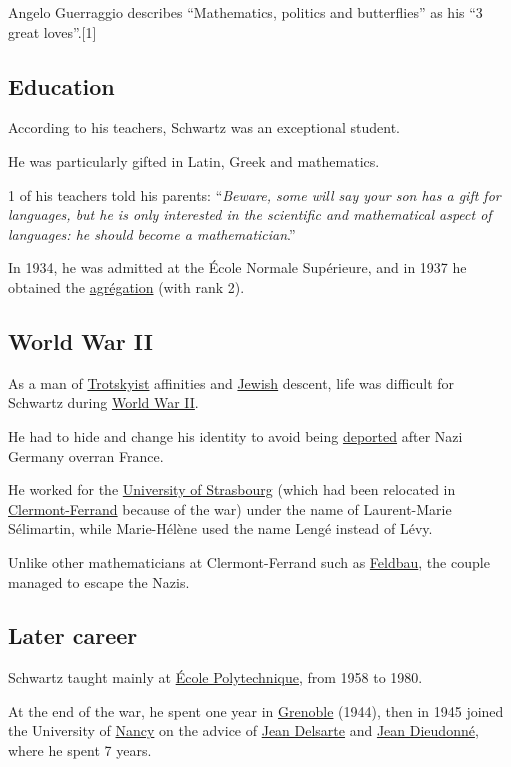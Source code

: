 \documentclass{book}
\numberwithin{equation}{section}
\begin{document}
%
Angelo Guerraggio describes ``Mathematics, politics and butterflies'' as his ``3 great loves''.[1]

\subsection{Education}
According to his teachers, Schwartz was an exceptional student.

He was particularly gifted in Latin, Greek and mathematics.

1 of his teachers told his parents: ``\textit{Beware, some will say your son has a gift for languages, but he is only interested in the scientific and mathematical aspect of languages: he should become a mathematician}.''

%
In 1934, he was admitted at the École Normale Supérieure, and in 1937 he obtained the \href{https://en.wikipedia.org/wiki/Agr%C3%A9gation}{agrégation} (with rank 2).

\subsection{World War II}
As a man of \href{https://en.wikipedia.org/wiki/Trotskyism}{Trotskyist} affinities and \href{https://en.wikipedia.org/wiki/Jew}{Jewish} descent, life was difficult for Schwartz during \href{https://en.wikipedia.org/wiki/World_War_II}{World War II}.

He had to hide and change his identity to avoid being \href{https://en.wikipedia.org/wiki/Deportation}{deported} after Nazi Germany overran France.

He worked for the \href{https://en.wikipedia.org/wiki/University_of_Strasbourg}{University of Strasbourg} (which had been relocated in \href{https://en.wikipedia.org/wiki/Clermont-Ferrand}{Clermont-Ferrand} because of the war) under the name of Laurent-Marie Sélimartin, while Marie-Hélène used the name Lengé instead of Lévy.

Unlike other mathematicians at Clermont-Ferrand such as \href{https://en.wikipedia.org/wiki/Jacques_Feldbau}{Feldbau}, the couple managed to escape the Nazis.

\subsection{Later career}
Schwartz taught mainly at \href{https://en.wikipedia.org/wiki/%C3%89cole_Polytechnique}{École Polytechnique}, from 1958 to 1980.
    
At the end of the war, he spent one year in \href{https://en.wikipedia.org/wiki/Grenoble}{Grenoble} (1944), then in 1945 joined the University of \href{https://en.wikipedia.org/wiki/Nancy,_France}{Nancy} on the advice of \href{https://en.wikipedia.org/wiki/Jean_Delsarte}{Jean Delsarte} and \href{https://en.wikipedia.org/wiki/Jean_Dieudonn%C3%A9}{Jean Dieudonné}, where he spent 7 years.
    
\end{document}
